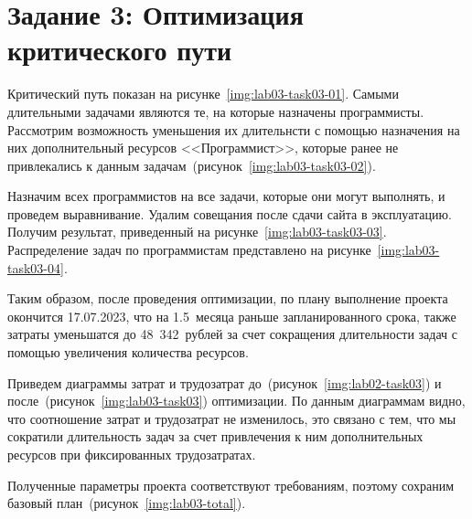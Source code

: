 \section{Задание 3: Оптимизация критического пути }

Критический путь показан на рисунке~\ref{img:lab03-task03-01}. Самыми
длительными задачами являются те, на которые назначены программисты. Рассмотрим
возможность уменьшения их длительнсти с помощью назначения на них
дополнительный ресурсов <<Программист>>, которые ранее не привлекались к данным
задачам~(рисунок~\ref{img:lab03-task03-02}).



Назначим всех программистов на все задачи, которые они могут выполнять, и
проведем выравнивание. Удалим совещания после сдачи сайта в эксплуатацию.
Получим результат, приведенный на рисунке~\ref{img:lab03-task03-03}.
Распределение задач по программистам представлено на
рисунке~\ref{img:lab03-task03-04}.



Таким образом, после проведения оптимизации, по плану выполнение проекта
окончится 17.07.2023, что на 1.5~месяца раньше запланированного срока, также
затраты уменьшатся до 48~342~рублей за счет сокращения длительности задач с
помощью увеличения количества ресурсов.

Приведем диаграммы затрат и трудозатрат до~(рисунок~\ref{img:lab02-task03})
и после~(рисунок~\ref{img:lab03-task03}) оптимизации.
По данным диаграммам видно, что соотношение затрат и трудозатрат не изменилось,
это связано с тем, что мы сократили длительность задач за счет привлечения к
ним дополнительных ресурсов при фиксированных трудозатратах.



Полученные параметры проекта соответствуют требованиям, поэтому сохраним
базовый план~(рисунок~\ref{img:lab03-total}).

